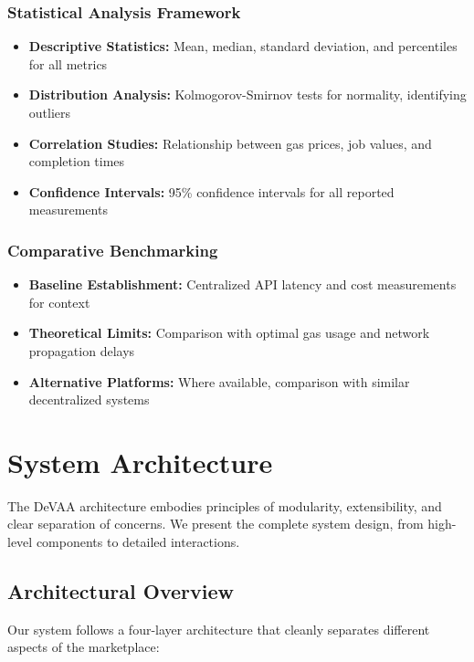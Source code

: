 \subsubsection{Statistical Analysis Framework}
\begin{itemize}
    \item \textbf{Descriptive Statistics:} Mean, median, standard deviation, and percentiles for all metrics
    \item \textbf{Distribution Analysis:} Kolmogorov-Smirnov tests for normality, identifying outliers
    \item \textbf{Correlation Studies:} Relationship between gas prices, job values, and completion times
    \item \textbf{Confidence Intervals:} 95\% confidence intervals for all reported measurements
\end{itemize}

\subsubsection{Comparative Benchmarking}
\begin{itemize}
    \item \textbf{Baseline Establishment:} Centralized API latency and cost measurements for context
    \item \textbf{Theoretical Limits:} Comparison with optimal gas usage and network propagation delays
    \item \textbf{Alternative Platforms:} Where available, comparison with similar decentralized systems
\end{itemize}

\section{System Architecture}

The DeVAA architecture embodies principles of modularity, extensibility, and clear separation of concerns. We present the complete system design, from high-level components to detailed interactions.

\subsection{Architectural Overview}

Our system follows a four-layer architecture that cleanly separates different aspects of the marketplace:

